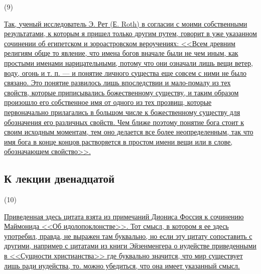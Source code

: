 \documentclass[12pt]{article}
\begin{document}
 \hypertarget{9}{(9)}  \hyperlink{b9}{Так, ученый исследователь Э. Рет (Е. Roth) в согласии с моими собственными результатами, к которым я пришел только другим путем, говорит в уже указанном сочинении об египетском и зороастровском вероучениях: <<Всем древним религиям обще то явление, что имена богов вначале были не чем иным, как простыми именами нарицательными, потому что они означали лишь вещи ветер, воду, огонь и т. п. --- и понятие личного существа еще совсем с ними не было связано. Это понятие развилось лишь впоследствии и мало-помалу из тех свойств, которые приписывались божественному существу, и таким образом произошло его собственное имя от одного из тех прозвищ, которые первоначально прилагались в большом числе к божественному существу для обозначения его различных свойств. Чем ближе поэтому понятие бога стоит к своим исходным моментам, тем оно делается все более неопределенным, так что имя бога в конце концов растворяется в простом имени вещи или в слове, обозначающем свойство>>.}

{}
\subsection*{К лекции двенадцатой} 

\hypertarget{10}{(10)} \hyperlink{b10}{Приведенная здесь цитата взята из примечаний Диониса Фоссия к сочинению Маймонида <<Об идолопоклонстве>>. Тот смысл, в котором я ее здесь употребил, правда, не выражен там буквально, но если эту цитату сопоставить с другими, например с цитатами из книги Эйзенменгера о иудействе приведенными в <<Сущности христианства>>  где буквально значится, что мир существует лишь ради иудейства, то. можно убедиться, что она имеет указанный смысл.}
\end{document}
